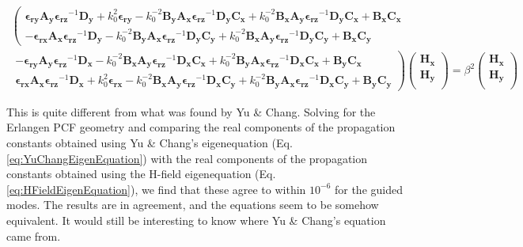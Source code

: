 \documentclass[]{article}
\begin{document}
\begin{multline}
\left(
\begin{matrix}
\mathbf{\epsilon_{ry}} \mathbf{A_y} \mathbf{\epsilon_{rz}}^{-1} \mathbf{D_y} + k_0^2 \mathbf{\epsilon_{ry}} - k_0^{-2} \mathbf{B_y} \mathbf{A_x} \mathbf{\epsilon_{rz}}^{-1} \mathbf{D_y} \mathbf{C_x} + k_0^{-2} \mathbf{B_x} \mathbf{A_y} \mathbf{\epsilon_{rz}}^{-1} \mathbf{D_y} \mathbf{C_x} + \mathbf{B_x} \mathbf{C_x}
\\
-\mathbf{\epsilon_{rx}}  \mathbf{A_x} \mathbf{\epsilon_{rz}}^{-1} \mathbf{D_y}  - k_0^{-2} \mathbf{B_y} \mathbf{A_x} \mathbf{\epsilon_{rz}}^{-1} \mathbf{D_y} \mathbf{C_y} + k_0^{-2} \mathbf{B_x} \mathbf{A_y} \mathbf{\epsilon_{rz}}^{-1} \mathbf{D_y} \mathbf{C_y} + \mathbf{B_x} \mathbf{C_y}
\end{matrix}
\right.
\\
\left.
\begin{matrix}
-\mathbf{\epsilon_{ry}} \mathbf{A_y} \mathbf{\epsilon_{rz}}^{-1} \mathbf{D_x} - k_0^{-2} \mathbf{B_x} \mathbf{A_y} \mathbf{\epsilon_{rz}}^{-1} \mathbf{D_x} \mathbf{C_x} + k_0^{-2} \mathbf{B_y} \mathbf{A_x} \mathbf{\epsilon_{rz}}^{-1} \mathbf{D_x} \mathbf{C_x} + \mathbf{B_y} \mathbf{C_x}
\\
\mathbf{\epsilon_{rx}} \mathbf{A_x} \mathbf{\epsilon_{rz}}^{-1} \mathbf{D_x} + k_0^2 \mathbf{\epsilon_{rx}}  - k_0^{-2} \mathbf{B_x} \mathbf{A_y} \mathbf{\epsilon_{rz}}^{-1} \mathbf{D_x} \mathbf{C_y} + k_0^{-2} \mathbf{B_y} \mathbf{A_x} \mathbf{\epsilon_{rz}}^{-1} \mathbf{D_x} \mathbf{C_y} + \mathbf{B_y} \mathbf{C_y}
\end{matrix}
\right)
\begin{pmatrix}
\mathbf{H_x} \\
\mathbf{H_y} \\
\end{pmatrix}
=
\beta^2
\begin{pmatrix}
\mathbf{H_x} \\
\mathbf{H_y} \\
\end{pmatrix}
\label{eq:HFieldEigenEquation}
\end{multline}

This is quite different from what was found by Yu \& Chang. Solving for the Erlangen PCF geometry and comparing the real components of the propagation constants obtained using Yu \& Chang's eigenequation (Eq. \ref{eq:YuChangEigenEquation}) with the real components of the propagation constants obtained using the H-field eigenequation (Eq. \ref{eq:HFieldEigenEquation}), we find that these agree to within $10^{-6}$ for the guided modes. The results are in agreement, and the equations seem to be somehow equivalent. It would still be interesting to know where Yu \& Chang's equation came from.
\end{document}
